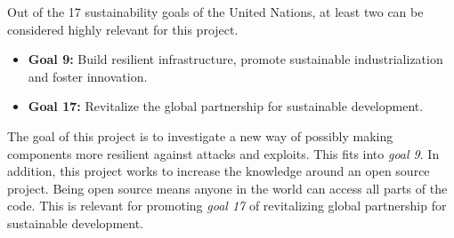 Out of the 17 sustainability goals of the United Nations\cite{un}, at least two can be considered highly relevant for this project. 

\begin{itemize}
    \item \textbf{Goal 9:} Build resilient infrastructure, promote sustainable industrialization and foster innovation.
    \item \textbf{Goal 17:} Revitalize the global partnership for sustainable development.
\end{itemize}

The goal of this project is to investigate a new way of possibly making components more resilient against attacks and exploits. This fits into \textit{goal 9}. In addition, this project works to increase the knowledge around an open source project. Being open source means anyone in the world can access all parts of the code. This is relevant for promoting \textit{goal 17} of revitalizing global partnership for sustainable development. 